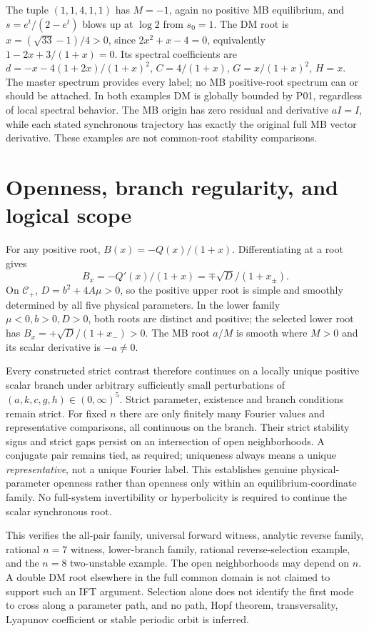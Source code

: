 \documentclass[11pt]{article}
\begin{document}
The tuple $(1,1,4,1,1)$ has $M=-1$, again no positive MB equilibrium,
and $s=e^t/(2-e^t)$ blows up at $\log2$ from $s_0=1$.
The DM root is $x=(\sqrt{33}-1)/4>0$, since
$2x^2+x-4=0$, equivalently $1-2x+3/(1+x)=0$. Its spectral
coefficients are $d=-x-4(1+2x)/(1+x)^2$,
$C=4/(1+x)$, $G=x/(1+x)^2$, $H=x$. The master spectrum provides
every label; no MB positive-root spectrum can or should be attached.
In both examples DM is globally bounded by P01, regardless of local
spectral behavior. The MB origin has zero residual and derivative
$aI=I$, while each stated synchronous trajectory has exactly the
original full MB vector derivative. These examples are not common-root
stability comparisons.

\section{Openness, branch regularity, and logical scope}
For any positive root, $B(x)=-Q(x)/(1+x)$. Differentiating at a
root gives
\[
 B_x=-Q'(x)/(1+x)=\mp\sqrt D/(1+x_\pm).
\]
On $\mathcal C_+$, $D=b^2+4A\mu>0$, so the positive upper root
is simple and smoothly determined by all five physical parameters.
In the lower family $\mu<0,b>0,D>0$, both roots are distinct and
positive; the selected lower root has $B_x=+\sqrt D/(1+x_-)>0$.
The MB root $a/M$ is smooth where $M>0$ and its scalar derivative
is $-a\ne0$.

Every constructed strict contrast therefore continues on a locally
unique positive scalar branch under arbitrary sufficiently small
perturbations of $(a,k,c,g,h)\in(0,\infty)^5$. Strict parameter,
existence and branch conditions remain strict. For fixed $n$ there are
only finitely many Fourier values and representative comparisons, all
continuous on the branch. Their strict stability signs and strict
gaps persist on an intersection of open neighborhoods. A conjugate pair
remains tied, as required; uniqueness always means a unique
\emph{representative}, not a unique Fourier label. This establishes
genuine physical-parameter openness rather than openness only within
an equilibrium-coordinate family. No full-system invertibility or
hyperbolicity is required to continue the scalar synchronous root.

This verifies the all-pair family, universal forward witness, analytic
reverse family, rational $n=7$ witness, lower-branch family, rational
reverse-selection example, and the $n=8$ two-unstable example. The
open neighborhoods may depend on $n$. A double DM root elsewhere in
the full common domain is not claimed to support such an IFT argument.
Selection alone does not identify the first mode to cross along a
parameter path, and no path, Hopf theorem, transversality, Lyapunov
coefficient or stable periodic orbit is inferred.
\end{document}
